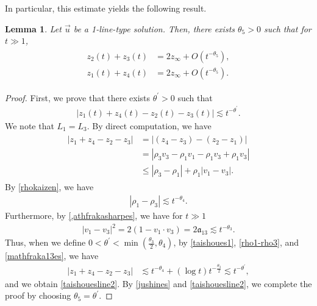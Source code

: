 \documentclass[10pt,a4paper]{amsart}
\newtheorem{lemma}[theorem]{Lemma}
\numberwithin{equation}{section}
\begin{document}
In particular, this estimate yields the following result.
\begin{lemma}
Let $\vec{u}$ be a 1-line-type solution. Then, there exists $\theta_5>0$ such that for $t\gg 1$,
\begin{align}\label{taishouesline}
\begin{aligned}
z_2(t)+z_3(t)&=2z_{\infty}+O\left(t^{-\theta_5}\right),
\\
z_1(t)+z_4(t)&=2z_{\infty}+O\left(t^{-\theta_5}\right).
\end{aligned}
\end{align}
\end{lemma}


\begin{proof}
First, we prove that there exists $\theta^{\prime}>0$ such that 
\begin{align}\label{taishouesline2}
\left|z_1(t)+z_4(t)-z_2(t)-z_3(t)\right|\lesssim t^{-\theta^{\prime}}.
\end{align}
We note that $L_1=L_3$. By direct computation, we have
\begin{align}\label{taishoues1}
\begin{aligned}
\left|z_1+z_4-z_2-z_3\right|&=\left|\left(z_4-z_3\right)-\left(z_2-z_1\right)\right|
\\
&=\left|\rho_3v_3-\rho_1v_1-\rho_1v_3+\rho_1v_3 \right|
\\
&\leq \left|\rho_3-\rho_1\right|+\rho_1\left|v_1-v_3\right|.
\end{aligned}
\end{align}
By \eqref{rhokaizen}, we have
\begin{align}\label{rho1-rho3}
\left|\rho_1-\rho_3\right|\lesssim t^{-\theta_4}.
\end{align}
Furthermore, by \eqref{,athfrakasharpes}, we have for $t\gg 1$
\begin{align}\label{mathfraka13es}
\left|v_1-v_3\right|^2=2\left(1-v_1\cdot v_3\right)=2\mathfrak{a}_{13}\lesssim t^{-\theta_3}.
\end{align}
Thus, when we define $0<\theta^{\prime}<\min{(\frac{\theta_3}{2},\theta_4)}$, by \eqref{taishoues1}, \eqref{rho1-rho3}, and \eqref{mathfraka13es}, we have
\begin{align*}
\left|z_1+z_4-z_2-z_3\right|&\lesssim t^{-\theta_4}+\left(\log{t}\right)t^{-\frac{\theta_3}{2}}\lesssim t^{-\theta^{\prime}},
\end{align*}
and we obtain \eqref{taishouesline2}. By \eqref{jushines} and \eqref{taishouesline2}, we complete the proof by choosing $\theta_5=\theta^{\prime}$.
\end{proof}
\end{document}
